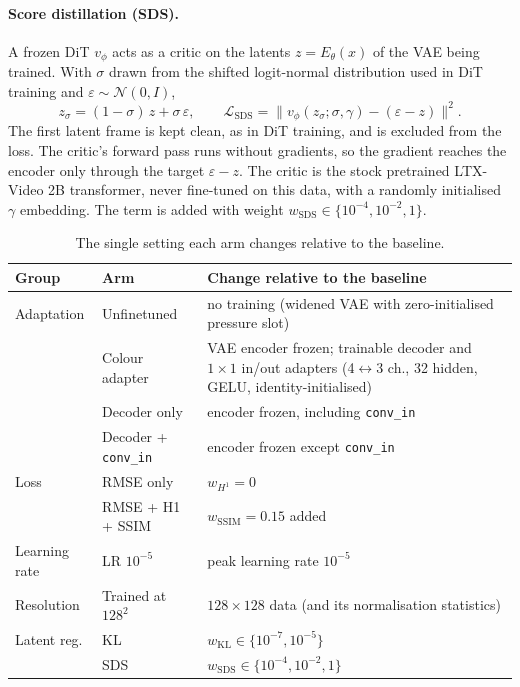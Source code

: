 \paragraph{Score distillation (SDS).} A frozen DiT $v_\phi$ acts as a critic on
the latents $z = E_\theta(x)$ of the VAE being trained. With
$\sigma$ drawn from the shifted logit-normal distribution used in DiT training
and $\varepsilon\sim\mathcal{N}(0,I)$,
\begin{equation}
  z_\sigma = (1-\sigma)\,z + \sigma\,\varepsilon, \qquad
  \mathcal{L}_\mathrm{SDS} = \bigl\lVert v_\phi(z_\sigma;\sigma,\gamma) - (\varepsilon - z)\bigr\rVert^2 .
\end{equation}
The first latent frame is kept clean, as in DiT training, and is excluded from
the loss. The critic's forward pass runs without gradients, so the gradient
reaches the encoder only through the target $\varepsilon - z$. The critic is
the stock pretrained LTX-Video 2B transformer, never fine-tuned on this data,
with a randomly initialised $\gamma$ embedding. The term is added with weight
$w_\mathrm{SDS}\in\{10^{-4},10^{-2},1\}$.

\begin{table}[htbp]
\centering
\small
\caption{The single setting each arm changes relative to the baseline.}
\label{tab:app_arms}
\begin{tabular}{lll}
\toprule
Group & Arm & Change relative to the baseline \\
\midrule
Adaptation & Unfinetuned & no training (widened VAE with zero-initialised pressure slot) \\
           & Colour adapter & VAE encoder frozen; trainable decoder and $1\times1$ in/out adapters (4$\leftrightarrow$3 ch., 32 hidden, GELU, identity-initialised) \\
           & Decoder only & encoder frozen, including \texttt{conv\_in} \\
           & Decoder + \texttt{conv\_in} & encoder frozen except \texttt{conv\_in} \\
\midrule
Loss & RMSE only & $w_{H^1} = 0$ \\
     & RMSE + H1 + SSIM & $w_\mathrm{SSIM} = 0.15$ added \\
\midrule
Learning rate & LR $10^{-5}$ & peak learning rate $10^{-5}$ \\
\midrule
Resolution & Trained at $128^2$ & $128\times128$ data (and its normalisation statistics) \\
\midrule
Latent reg. & KL & $w_\mathrm{KL} \in \{10^{-7}, 10^{-5}\}$ \\
            & SDS & $w_\mathrm{SDS} \in \{10^{-4}, 10^{-2}, 1\}$ \\
\bottomrule
\end{tabular}
\end{table}

